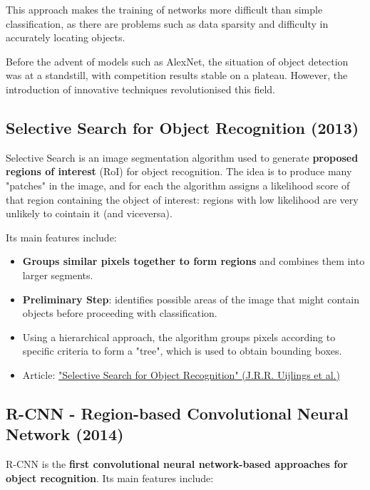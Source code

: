 This approach makes the training of networks more difficult than simple classification, as there are problems such as data sparsity and difficulty in accurately locating objects. 

Before the advent of models such as AlexNet, the situation of object detection was at a standstill, with competition results stable on a plateau. However, the introduction of innovative techniques revolutionised this field.

\subsection{Selective Search for Object Recognition (2013)}
Selective Search is an image segmentation algorithm used to generate \textbf{proposed regions of interest} (RoI) for object recognition. The idea is to produce many "patches" in the image, and for each the algorithm assigns a likelihood score of that region containing the object of interest: regions with low likelihood are very unlikely to cointain it (and viceversa).

Its main features include:

\begin{itemize}
    \item \textbf{Groups similar pixels together to form regions} and combines them into larger segments.
    \item \textbf{Preliminary Step}: identifies possible areas of the image that might contain objects before proceeding with classification.
    \item Using a hierarchical approach, the algorithm groups pixels according to specific criteria to form a "tree", which is used to obtain bounding boxes.
    \item Article: \href{https://ivi.fnwi.uva.nl/isis/publications/2013/UijlingsIJCV2013/UijlingsIJCV2013.pdf}{"Selective Search for Object Recognition" (J.R.R. Uijlings et al.)}
\end{itemize}


\subsection{R-CNN - Region-based Convolutional Neural Network (2014)}
R-CNN is the \textbf{first convolutional neural network-based approaches for object recognition}. Its main features include:

